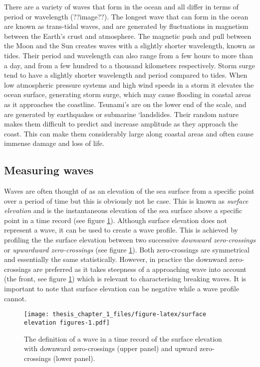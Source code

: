 \documentclass[
]{article}
\begin{document}
There are a variety of waves that form in the ocean and all differ in
terms of period or wavelength (??image??). The longest wave that can
form in the ocean are known as trans-tidal waves, and are generated by
fluctuations in magnetism between the Earth's crust and atmosphere. The
magnetic push and pull between the Moon and the Sun creates waves with a
slightly shorter wavelength, known as tides. Their period and wavelength
can also range from a few hours to more than a day, and from a few
hundred to a thousand kilometers respectively. Storm surge tend to have
a slightly shorter wavelength and period compared to tides. When low
atmospheric pressure systems and high wind speeds in a storm it elevates
the ocean surface, generating storm surge, which may cause flooding in
coastal areas as it approaches the coastline. Tsunami's are on the lower
end of the scale, and are generated by earthquakes or submarine
`landslides. Their random nature makes them difficult to predict and
increase amplitude as they approach the coast. This can make them
considerably large along coastal areas and often cause immense damage
and loss of life.

\hypertarget{measuring-waves}{%
\subsection{Measuring waves}\label{measuring-waves}}

Waves are often thought of as an elevation of the sea surface from a
specific point over a period of time but this is obviously not he case.
This is known as \emph{surface elevation} and is the instantaneous
elevation of the sea surface above a specific point in a time record
(see figure \ref{fig:surface elevation figures}). Although surface
elevation does not represent a wave, it can be used to create a wave
profile. This is achieved by profiling the the surface elevation between
two successive \emph{downward zero-crossings} or \emph{upwardward
zero-crossings} (see figure \ref{fig:surface elevation figures}). Both
zero-crossings are symmetrical and essentially the same statistically.
However, in practice the downward zero-crossings are preferred as it
takes steepness of a approaching wave into account (the front, see
figure \ref{fig:surface elevation figures}) which is relevant to
characterising breaking waves. It is important to note that surface
elevation can be negative while a wave profile cannot.

\begin{figure}
\centering
\texttt{[image: thesis\_chapter\_1\_files/figure-latex/surface elevation figures-1.pdf]}
\caption{\label{fig:surface elevation figures}The definition of a wave
in a time record of the surface elevation with downward zero-crossings
(upper panel) and upward zero-crossings (lower panel).}
\end{figure}
\end{document}
